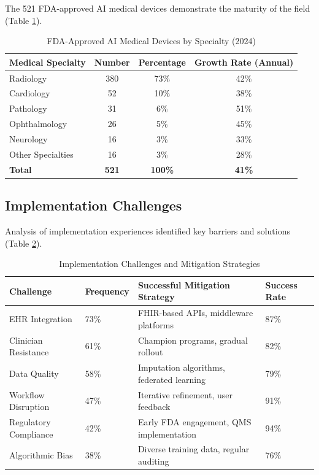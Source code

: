 \documentclass[12pt,letterpaper]{article}
\begin{document}
The 521 FDA-approved AI medical devices demonstrate the maturity of the field (Table \ref{tab:fda_devices}).

\begin{table}[H]
\centering
\caption{FDA-Approved AI Medical Devices by Specialty (2024)}
\label{tab:fda_devices}
\begin{tabular}{@{}lccc@{}}
\toprule
\textbf{Medical Specialty} & \textbf{Number} & \textbf{Percentage} & \textbf{Growth Rate (Annual)} \\
\midrule
Radiology & 380 & 73\% & 42\% \\
Cardiology & 52 & 10\% & 38\% \\
Pathology & 31 & 6\% & 51\% \\
Ophthalmology & 26 & 5\% & 45\% \\
Neurology & 16 & 3\% & 33\% \\
Other Specialties & 16 & 3\% & 28\% \\
\midrule
\textbf{Total} & \textbf{521} & \textbf{100\%} & \textbf{41\%} \\
\bottomrule
\end{tabular}
\end{table}

\subsection{Implementation Challenges}

Analysis of implementation experiences identified key barriers and solutions (Table \ref{tab:challenges}).

\begin{table}[H]
\centering
\caption{Implementation Challenges and Mitigation Strategies}
\label{tab:challenges}
\begin{tabular}{@{}p{3cm}p{2cm}p{5cm}p{2cm}@{}}
\toprule
\textbf{Challenge} & \textbf{Frequency} & \textbf{Successful Mitigation Strategy} & \textbf{Success Rate} \\
\midrule
EHR Integration & 73\% & FHIR-based APIs, middleware platforms & 87\% \\
Clinician Resistance & 61\% & Champion programs, gradual rollout & 82\% \\
Data Quality & 58\% & Imputation algorithms, federated learning & 79\% \\
Workflow Disruption & 47\% & Iterative refinement, user feedback & 91\% \\
Regulatory Compliance & 42\% & Early FDA engagement, QMS implementation & 94\% \\
Algorithmic Bias & 38\% & Diverse training data, regular auditing & 76\% \\
\bottomrule
\end{tabular}
\end{table}
\end{document}
